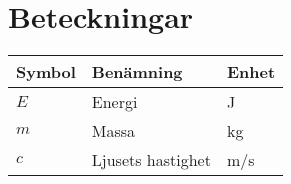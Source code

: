 \section*{Beteckningar}
%
\vspace{-5mm}
\begin{table}[H]
\begin{tabular}{@{} l l l @{}}
\toprule
\textbf{Symbol} & \textbf{Benämning} & \textbf{Enhet} \\
\midrule
    $E$ & Energi & \si{J} \\
    $m$ & Massa & \si{kg} \\
    $c$ & Ljusets hastighet & \si{m/s} \\
\bottomrule
\end{tabular}
\end{table}
